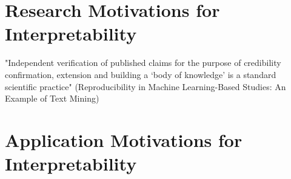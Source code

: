\documentclass[main]{subfiles}
\begin{document}
\section{Research Motivations for Interpretability}

"Independent verification of published claims for the purpose of credibility confirmation, extension
and building a ‘body of knowledge’ is a standard scientific practice" (Reproducibility in Machine Learning-Based Studies: An Example of Text Mining)


\section{Application Motivations for Interpretability}
\end{document}
